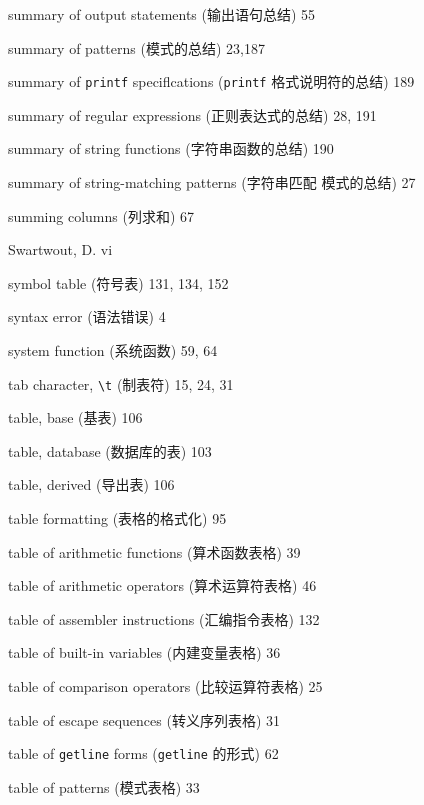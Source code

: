 \begin{multicols}{2}
\hangindent=2pc  summary of output statements (输出语句总结) 55

\hangindent=2pc  summary of patterns (模式的总结) 23,187

\hangindent=2pc  summary of \verb'printf' speciflcations
(\verb'printf' 格式说明符的总结) 189

\hangindent=2pc  summary of regular expressions (正则表达式的总结)
28, 191

\hangindent=2pc  summary of string functions (字符串函数的总结) 190

\hangindent=2pc  summary of string-matching patterns (字符串匹配 
模式的总结) 27

\hangindent=2pc  summing columns (列求和) 67

\hangindent=2pc  Swartwout, D. vi

\hangindent=2pc  symbol table (符号表) 131, 134, 152

\hangindent=2pc  syntax error (语法错误) 4

\hangindent=2pc  system function (系统函数) 59, 64

\hangindent=2pc  tab character, \verb'\t' (制表符) 15, 24, 31

\hangindent=2pc  table, base (基表) 106

\hangindent=2pc  table, database (数据库的表) 103

\hangindent=2pc  table, derived (导出表) 106

\hangindent=2pc  table formatting (表格的格式化) 95

\hangindent=2pc  table of arithmetic functions (算术函数表格) 39

\hangindent=2pc  table of arithmetic operators (算术运算符表格) 46

\hangindent=2pc  table of assembler instructions (汇编指令表格) 132

\hangindent=2pc  table of built-in variables (内建变量表格) 36

\hangindent=2pc  table of comparison operators (比较运算符表格) 25

\hangindent=2pc  table of escape sequences (转义序列表格) 31

\hangindent=2pc  table of \verb'getline' forms (\verb'getline'
的形式) 62

\hangindent=2pc  table of patterns (模式表格) 33


\end{multicols}
